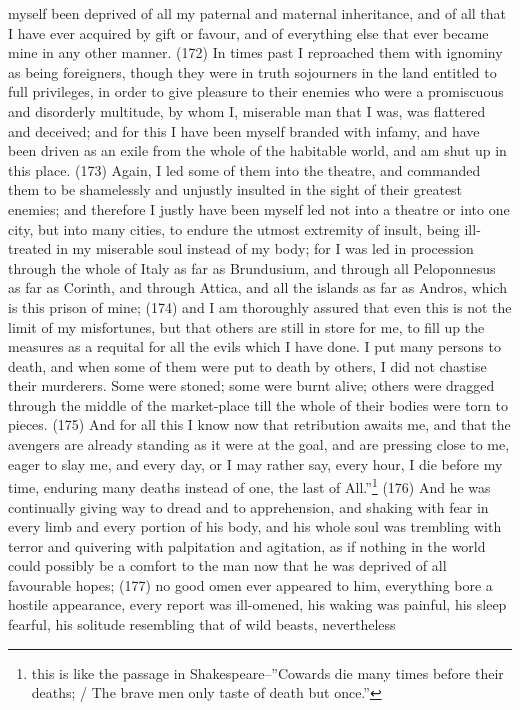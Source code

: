 myself been deprived of all my paternal and maternal inheritance, and of all that I have ever
acquired by gift or favour, and of everything else that ever became mine in any other manner.
(172) In times past I reproached them with ignominy as being foreigners, though they were in truth
sojourners in the land entitled to full privileges, in order to give pleasure to their enemies who were
a promiscuous and disorderly multitude, by whom I, miserable man that I was, was flattered and
deceived; and for this I have been myself branded with infamy, and have been driven as an exile
from the whole of the habitable world, and am shut up in this place. (173) Again, I led some of them
into the theatre, and commanded them to be shamelessly and unjustly insulted in the sight of their
greatest enemies; and therefore I justly have been myself led not into a theatre or into one city, but
into many cities, to endure the utmost extremity of insult, being ill-treated in my miserable soul
instead of my body; for I was led in procession through the whole of Italy as far as Brundusium, and
through all Peloponnesus as far as Corinth, and through Attica, and all the islands as far as
Andros, which is this prison of mine; (174) and I am thoroughly assured that even this is not the
limit of my misfortunes, but that others are still in store for me, to fill up the measures as a requital
for all the evils which I have done. I put many persons to death, and when some of them were put to
death by others, I did not chastise their murderers. Some were stoned; some were burnt alive;
others were dragged through the middle of the market-place till the whole of their bodies were torn
to pieces. (175) And for all this I know now that retribution awaits me, and that the avengers are
already standing as it were at the goal, and are pressing close to me, eager to slay me, and every
day, or I may rather say, every hour, I die before my time, enduring many deaths instead of one,
the last of All.''\footnote{this is like the passage in Shakespeare--''Cowards die many times before their deaths; / The brave
men only taste of death but once.''} (176) And he was continually giving way to dread and to
apprehension, and shaking with fear in every limb and every portion of his body, and his whole soul
was trembling with terror and quivering with palpitation and agitation, as if nothing in the world could
possibly be a comfort to the man now that he was deprived of all favourable hopes; (177) no good
omen ever appeared to him, everything bore a hostile appearance, every report was ill-omened,
his waking was painful, his sleep fearful, his solitude resembling that of wild beasts, nevertheless
